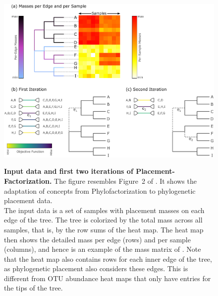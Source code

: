 \begin{figure}[!htbp]
    \centering
    \includegraphics[width=\linewidth]{pdf/phylofactor.pdf}
    \begin{subfigure}{0pt}
        \label{fig:phylofactor:sub:heat_tree}
    \end{subfigure}
    \begin{subfigure}{0pt}
        \label{fig:phylofactor:sub:first}
    \end{subfigure}
    \begin{subfigure}{0pt}
        \label{fig:phylofactor:sub:second}
    \end{subfigure}
    \caption[Input data and first two iterations of Placement-Factorization]{
        \textbf{Input data and first two iterations of Placement-Factorization.}
        The figure resembles Figure~2 of .
        It shows the adaptation of concepts from Phylofactorization to phylogenetic placement data.
        \\
        The input data is a set of samples with placement masses on each edge of the tree.
        The tree is colorized by the total mass across all samples, that is, by the row sums of the heat map.
        The heat map then shows the detailed mass per edge (rows) and per sample (columns),
        and hence is an example of the mass matrix of .
        Note that the heat map also contains rows for each inner edge of the tree,
        as phylogenetic placement also considers these edges.
        This is different from OTU abundance heat maps that only have entries for the tips of the tree.
}
\end{figure}
